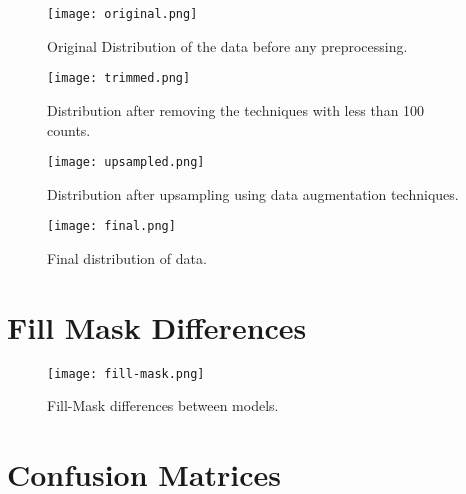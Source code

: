 \documentclass[11pt]{article}
\begin{document}
\begin{figure*}[h]
    \centering
    \texttt{[image: original.png]}
    \caption{Original Distribution of the data before any preprocessing.}
    \label{fig:og}
\end{figure*}

\begin{figure*}[h]
    \centering
    \texttt{[image: trimmed.png]}
    \caption{Distribution after removing the techniques with less than 100 counts.}
    \label{fig:trimmed}
\end{figure*}
\clearpage
\begin{figure*}[h]
    \centering
    \texttt{[image: upsampled.png]}
    \caption{Distribution after upsampling using data augmentation techniques.}
    \label{fig:upscaled}
\end{figure*}

\begin{figure*}[h]
    \centering
    \texttt{[image: final.png]}
    \caption{Final distribution of data.}
    \label{fig:final}
\end{figure*}

\clearpage
\section{Fill Mask Differences}
\label{sec:fillmask}
\begin{figure}[h]
    \centering
    \texttt{[image: fill-mask.png]}
    \caption{Fill-Mask differences between models.}
    \label{fig:fill-mask}
\end{figure}

\clearpage
\section{Confusion Matrices}
\label{sec:cm}
\end{document}
